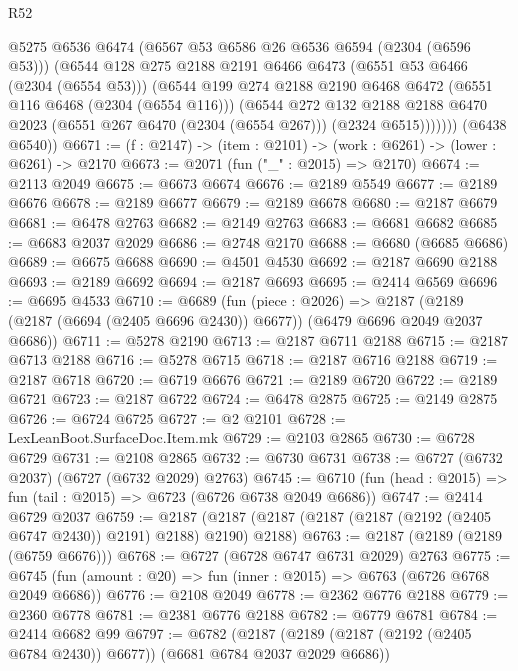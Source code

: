 \begin{lexlean}{R52}
\begin{coremodule}
            @5275
            @6536
            @6474
            (@6567 @53 @6586 @26 @6536 @6594 (@2304 (@6596 @53)))
            (@6544
              @128
              @275
              @2188
              @2191
              @6466
              @6473
              (@6551 @53 @6466 (@2304 (@6554 @53)))
              (@6544
                @199
                @274
                @2188
                @2190
                @6468
                @6472
                (@6551 @116 @6468 (@2304 (@6554 @116)))
                (@6544
                  @272
                  @132
                  @2188
                  @2188
                  @6470
                  @2023
                  (@6551 @267 @6470 (@2304 (@6554 @267)))
                  (@2324 @6515)))))))
      (@6438 @6540))
@6671 := (f : @2147) -> (item : @2101) -> (work : @6261) -> (lower : @6261) -> @2170
@6673 := @2071 (fun ("_" : @2015) => @2170)
@6674 := @2113 @2049
@6675 := @6673 @6674
@6676 := @2189 @5549
@6677 := @2189 @6676
@6678 := @2189 @6677
@6679 := @2189 @6678
@6680 := @2187 @6679
@6681 := @6478 @2763
@6682 := @2149 @2763
@6683 := @6681 @6682
@6685 := @6683 @2037 @2029
@6686 := @2748 @2170
@6688 := @6680 (@6685 @6686)
@6689 := @6675 @6688
@6690 := @4501 @4530
@6692 := @2187 @6690 @2188
@6693 := @2189 @6692
@6694 := @2187 @6693
@6695 := @2414 @6569
@6696 := @6695 @4533
@6710 := @6689
    (fun (piece : @2026) =>
    @2187 (@2189 (@2187 (@6694 (@2405 @6696 @2430)) @6677)) (@6479 @6696 @2049 @2037 @6686))
@6711 := @5278 @2190
@6713 := @2187 @6711 @2188
@6715 := @2187 @6713 @2188
@6716 := @5278 @6715
@6718 := @2187 @6716 @2188
@6719 := @2187 @6718
@6720 := @6719 @6676
@6721 := @2189 @6720
@6722 := @2189 @6721
@6723 := @2187 @6722
@6724 := @6478 @2875
@6725 := @2149 @2875
@6726 := @6724 @6725
@6727 := @2 @2101
@6728 := LexLeanBoot.SurfaceDoc.Item.mk
@6729 := @2103 @2865
@6730 := @6728 @6729
@6731 := @2108 @2865
@6732 := @6730 @6731
@6738 := @6727 (@6732 @2037) (@6727 (@6732 @2029) @2763)
@6745 := @6710 (fun (head : @2015) => fun (tail : @2015) => @6723 (@6726 @6738 @2049 @6686))
@6747 := @2414 @6729 @2037
@6759 := @2187 (@2187 (@2187 (@2187 (@2187 (@2192 (@2405 @6747 @2430)) @2191) @2188) @2190) @2188)
@6763 := @2187 (@2189 (@2189 (@6759 @6676)))
@6768 := @6727 (@6728 @6747 @6731 @2029) @2763
@6775 := @6745 (fun (amount : @20) => fun (inner : @2015) => @6763 (@6726 @6768 @2049 @6686))
@6776 := @2108 @2049
@6778 := @2362 @6776 @2188
@6779 := @2360 @6778
@6781 := @2381 @6776 @2188
@6782 := @6779 @6781
@6784 := @2414 @6682 @99
@6797 := @6782
    (@2187 (@2189 (@2187 (@2192 (@2405 @6784 @2430)) @6677)) (@6681 @6784 @2037 @2029 @6686))

\end{coremodule}
\end{lexlean}
